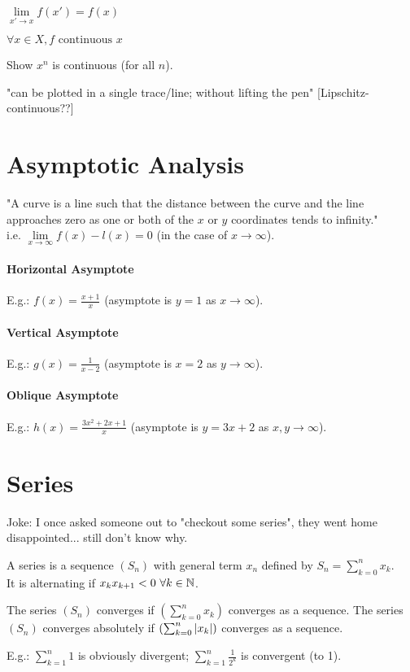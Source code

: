 \begin{definition}[$f$ continuous at $x$]
	$\lim\limits_{x' \to x} f(x') = f(x)$
\end{definition}
\begin{definition}[$f$ continuous on $X$]
	$\forall x \in X, f \text{ continuous } x$
\end{definition}
\begin{question}
	Show $x^n$ is continuous (for all $n$).
\end{question}
"can be plotted in a single trace/line; without lifting the pen"
[Lipschitz-continuous??]



\section{Asymptotic Analysis}

\begin{definition}[Asymptote]
	"A curve is a line such that the distance between the curve and the line approaches zero as one or both of the $x$ or $y$ coordinates tends to infinity." \\
	i.e. $\lim\limits_{x \to \infty} f(x)-l(x) = 0$ (in the case of $x \to \infty$).
\end{definition}
\paragraph{Horizontal Asymptote}
E.g.: $f(x) = \frac{x+1}{x}$ (asymptote is $y=1$ as $x \to \infty$).
\paragraph{Vertical Asymptote}
E.g.: $g(x) = \frac{1}{x-2}$ (asymptote is $x=2$ as $y \to \infty$).
\paragraph{Oblique Asymptote}
E.g.: $h(x) = \frac{3x^2+2x+1}{x}$ (asymptote is $y=3x+2$ as $x,y \to \infty$).



\section{Series}
Joke: I once asked someone out to "checkout some series", they went home disappointed... still don't know why.
\begin{definition}[Series]
	A series is a sequence $(S_n)$ with general term $x_n$ defined by $S_n = \sum_{k=0}^{n} x_k$.\\
	It is alternating if $x_k x_{k+1} < 0 \ \forall k \in \N$.
\end{definition}
\begin{definition}
	The series $(S_n)$ converges if $\left( \sum_{k=0}^{n} x_k \right)$ converges as a sequence.
	The series $(S_n)$ converges absolutely if $\left( \sum_{k=0}^{n} | x_k | \right)$ converges as a sequence.
\end{definition}
E.g.: $\sum_{k=1}^n 1$ is obviously divergent;
$\sum_{k=1}^n \frac{1}{2^k}$ is convergent (to 1).

